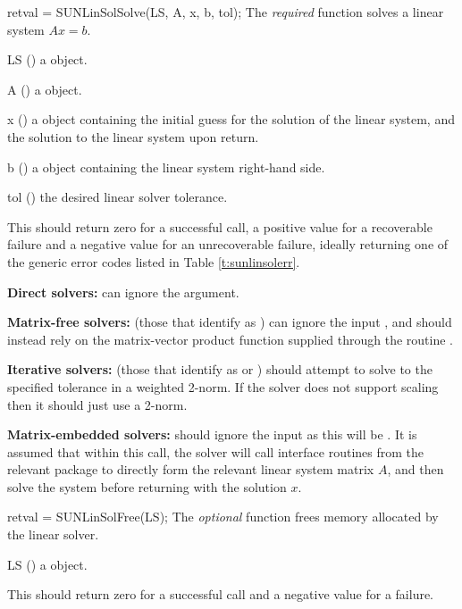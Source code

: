 {}
{
  retval = SUNLinSolSolve(LS, A, x, b, tol);
}
{
  The \textit{required} function  solves a linear system $Ax = b$.
}
{
  \begin{args}[tol]
  \item[LS] ()
    a {\sunlinsol} object.
  \item[A] ()
    a {\sunmatrix} object.
  \item[x] ()
    a {\nvector} object containing the initial guess for the solution of the
    linear system, and the solution to the linear system upon return.
  \item[b] ()
    a {\nvector} object containing the linear system right-hand side.
  \item[tol] ()
    the desired linear solver tolerance.
  \end{args}
}
{
  This should return zero for
  a successful call, a positive value for a recoverable failure and a
  negative value for an unrecoverable failure, ideally returning one
  of the generic error codes listed in Table \ref{t:sunlinsolerr}.
}
{
  {\bf Direct solvers:} can ignore the  argument.

  {\bf Matrix-free solvers:} (those that identify as
  ) can ignore the {\sunmatrix} input
  , and should instead rely on the matrix-vector product
  function supplied through the routine .

  {\bf Iterative solvers:} (those that identify as
   or \newline
  )
  should attempt to solve to the specified tolerance  in a weighted
  2-norm. If the solver does not support scaling then it should just use a
  2-norm.

  {\bf Matrix-embedded solvers:} should ignore the {\sunmatrix} input 
  as this will be .  It is assumed that within this call, the solver
  will call interface routines from the relevant {\sundials} package to
  directly form the relevant linear system matrix $A$, and then solve the system
  before returning with the solution $x$.
}
{
  retval = SUNLinSolFree(LS);
}
{
  The \textit{optional} function  frees memory allocated by the linear solver.
}
{
  \begin{args}[LS]
  \item[LS] ()
    a {\sunlinsol} object.
  \end{args}
}
{
  This should return zero for a successful call and a negative value
  for a failure.
}
{}


